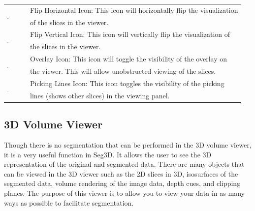\documentclass[fleqn,11pt,openany]{book}
\begin{document}
\begin{table}[h!]
\begin{tabular}{|l|l|}
& \\
\hline
\multirow{2}{*}{ \includegraphics[width=0.05\textwidth]{Seg3DBasicFunctionality_figures/FlipHorizOff.png} }
& Flip Horizontal Icon: This icon will horizontally flip the visualization \\
& of the slices in the viewer.\\
\hline
\multirow{2}{*}{ \includegraphics[width=0.05\textwidth]{Seg3DBasicFunctionality_figures/FlipVertOff.png} }
& Flip Vertical Icon: This icon will vertically flip the visualization of \\
& the slices in the viewer.\\
\hline
\multirow{2}{*}{ \includegraphics[width=0.05\textwidth]{Seg3DBasicFunctionality_figures/OverlayOff.png} }
&  Overlay Icon: This icon will toggle the visibility of the overlay on \\
& the viewer.  This will allow unobstructed viewing of the slices.\\
\hline
\multirow{2}{*}{ \includegraphics[width=0.05\textwidth]{Seg3DBasicFunctionality_figures/PickingLinesOff.png} }
& Picking Lines Icon: This icon toggles the visibility of the picking\\
& lines (shows other slices) in the viewing panel.\\
\hline
\end{tabular}
\end{table}

\subsection{3D Volume Viewer}

Though there is no segmentation that can be performed in the 3D volume viewer, it is a very useful function in Seg3D.  It allows the user to see the 3D representation of the original and segmented data.  There are many objects that can be viewed in the 3D viewer such as the 2D slices in 3D, isosurfaces of the segmented data, volume rendering of the image data,  depth cues, and clipping planes.  The purpose of this viewer is to allow you to view your data in as many ways as possible to facilitate segmentation.
\end{document}
